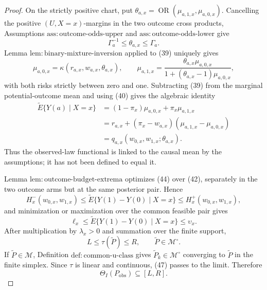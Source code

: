 \documentclass{article}
\begin{document}
\begin{proof}
On the strictly positive chart, put \(\theta_{a,x}=\operatorname{OR}(\mu_{a,1,x},\mu_{a,0,x})\).  Cancelling the positive \((U,X=x)\)-margins in the two outcome cross products, Assumptions \(\mathrm{ass{:}outcome\text{-}odds\text{-}upper}\) and \(\mathrm{ass{:}outcome\text{-}odds\text{-}lower}\) give
\[
 \Gamma_a^{-1}\leq\theta_{a,x}\leq\Gamma_a.                          \tag{42}
\]
Lemma \(\mathrm{lem{:}binary\text{-}mixture\text{-}inversion}\) applied to (39) uniquely gives
\[
 \mu_{a,0,x}=\kappa(r_{a,x},w_{a,x},\theta_{a,x}),
 \qquad
 \mu_{a,1,x}
 =\frac{\theta_{a,x}\mu_{a,0,x}}
        {1+(\theta_{a,x}-1)\mu_{a,0,x}},                               \tag{43}
\]
with both risks strictly between zero and one.  Subtracting (39) from the marginal potential-outcome mean and using (40) gives the algebraic identity
\[
\begin{aligned}
 \widetilde E\{Y(a)\mid X=x\}
 &=(1-\pi_x)\mu_{a,0,x}+\pi_x\mu_{a,1,x}\\
 &=r_{a,x}+(\pi_x-w_{a,x})(\mu_{a,1,x}-\mu_{a,0,x})\\
 &=q_{a,x}(w_{0,x},w_{1,x};\theta_{a,x}).
\end{aligned}                                                           \tag{44}
\]
Thus the observed-law functional is linked to the causal mean by the assumptions; it has not been defined to equal it.

Lemma \(\mathrm{lem{:}outcome\text{-}budget\text{-}extrema}\) optimizes (44) over (42), separately in the two outcome arms but at the same posterior pair.  Hence
\[
 H_x^-(w_{0,x},w_{1,x})
 \leq \widetilde E\{Y(1)-Y(0)\mid X=x\}
 \leq H_x^+(w_{0,x},w_{1,x}),                                         \tag{45}
\]
and minimization or maximization over the common feasible pair gives
\[
 \ell_x\leq\widetilde E\{Y(1)-Y(0)\mid X=x\}\leq\upsilon_x.          \tag{46}
\]
After multiplication by \(\lambda_x>0\) and summation over the finite support,
\[
 L\leq\tau(\widetilde P)\leq R,
 \qquad \widetilde P\in\mathcal M^{\circ}.                            \tag{47}
\]
If \(\widetilde P\in\mathcal M\), Definition \(\mathrm{def{:}common\text{-}u\text{-}class}\) gives \(\widetilde P_k\in\mathcal M^{\circ}\) converging to \(\widetilde P\) in the finite simplex.  Since \(\tau\) is linear and continuous, (47) passes to the limit.  Therefore
\[
 \Theta_I(P_{\mathrm{obs}})\subseteq[L,R].                             \tag{48}
\]


\end{proof}
\end{document}
